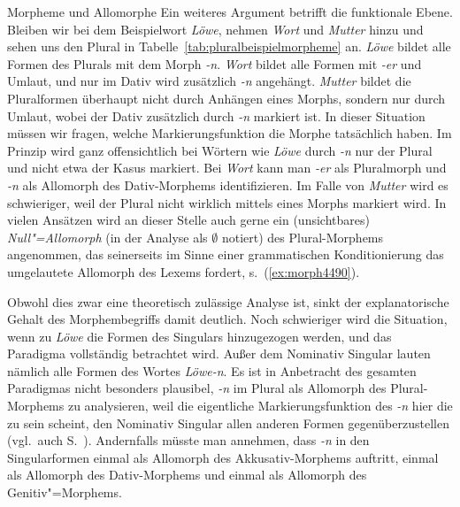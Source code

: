 \begin{Vertiefung}{Morpheme und Allomorphe}
Ein weiteres Argument betrifft die funktionale Ebene.
Bleiben wir bei dem Beispielwort \textit{Löwe}, nehmen \textit{Wort} und \textit{Mutter} hinzu und sehen uns den Plural in Tabelle~\ref{tab:pluralbeispielmorpheme} an.
\textit{Löwe} bildet alle Formen des Plurals mit dem Morph \textit{-n}.
\textit{Wort} bildet alle Formen mit \textit{-er} und Umlaut, und nur im Dativ wird zusätzlich \textit{-n} angehängt.
\textit{Mutter} bildet die Pluralformen überhaupt nicht durch Anhängen eines Morphs, sondern nur durch Umlaut, wobei der Dativ zusätzlich durch \textit{-n} markiert ist.
In dieser Situation müssen wir fragen, welche Markierungsfunktion die Morphe tatsächlich haben.
Im Prinzip wird ganz offensichtlich bei Wörtern wie \textit{Löwe} durch \textit{-n} nur der Plural und nicht etwa der Kasus markiert.
Bei \textit{Wort} kann man \textit{-er} als Pluralmorph und \textit{-n} als Allomorph des Dativ-Morphems identifizieren.
Im Falle von \textit{Mutter} wird es schwieriger, weil der Plural nicht wirklich mittels eines Morphs markiert wird.
In vielen Ansätzen wird an dieser Stelle auch gerne ein (unsichtbares) \textit{Null"=Allomorph} (in der Analyse \zB als $\emptyset$ notiert) des Plural-Morphems angenommen, das seinerseits im Sinne einer grammatischen Konditionierung das umgelautete Allomorph des Lexems fordert, s.\ (\ref{ex:morph4490}).

\begin{exe}
\end{exe}

Obwohl dies zwar eine theoretisch zulässige Analyse ist, sinkt der explanatorische Gehalt des Morphembegriffs damit deutlich.
Noch schwieriger wird die Situation, wenn zu \textit{Löwe} die Formen des Singulars hinzugezogen werden, und das Paradigma vollständig betrachtet wird.
Außer dem Nominativ Singular lauten nämlich alle Formen des Wortes \textit{Löwe-n}.
Es ist in Anbetracht des gesamten Paradigmas nicht besonders plausibel, \textit{-n} im Plural als Allomorph des Plural-Morphems zu analysieren, weil die eigentliche Markierungsfunktion des \textit{-n} hier die zu sein scheint, den Nominativ Singular allen anderen Formen gegenüberzustellen (vgl.\ auch S.~\pageref{abs:4578239547}).
Andernfalls müsste man annehmen, dass \textit{-n} in den Singularformen einmal als Allomorph des Akkusativ-Morphems auftritt, einmal als Allomorph des Dativ-Morphems und einmal als Allomorph des Genitiv"=Morphems.



\end{Vertiefung}
